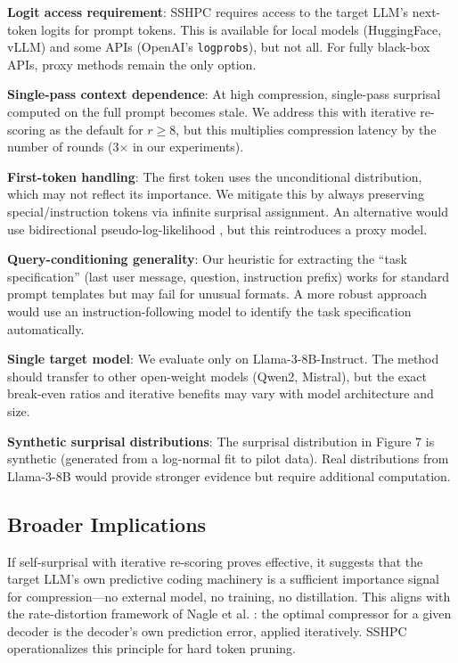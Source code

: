 \documentclass[11pt,letterpaper]{article}
\begin{document}
\textbf{Logit access requirement}: SSHPC requires access to the target LLM's next-token logits for prompt tokens. This is available for local models (HuggingFace, vLLM) and some APIs (OpenAI's \texttt{logprobs}), but not all. For fully black-box APIs, proxy methods remain the only option.

\textbf{Single-pass context dependence}: At high compression, single-pass surprisal computed on the full prompt becomes stale. We address this with iterative re-scoring as the default for $r \ge 8$, but this multiplies compression latency by the number of rounds (3$\times$ in our experiments).

\textbf{First-token handling}: The first token uses the unconditional distribution, which may not reflect its importance. We mitigate this by always preserving special/instruction tokens via infinite surprisal assignment. An alternative would use bidirectional pseudo-log-likelihood \citep{Salazar2020}, but this reintroduces a proxy model.

\textbf{Query-conditioning generality}: Our heuristic for extracting the ``task specification'' (last user message, question, instruction prefix) works for standard prompt templates but may fail for unusual formats. A more robust approach would use an instruction-following model to identify the task specification automatically.

\textbf{Single target model}: We evaluate only on Llama-3-8B-Instruct. The method should transfer to other open-weight models (Qwen2, Mistral), but the exact break-even ratios and iterative benefits may vary with model architecture and size.

\textbf{Synthetic surprisal distributions}: The surprisal distribution in Figure 7 is synthetic (generated from a log-normal fit to pilot data). Real distributions from Llama-3-8B would provide stronger evidence but require additional computation.

\subsection{Broader Implications}

If self-surprisal with iterative re-scoring proves effective, it suggests that the target LLM's own predictive coding machinery is a sufficient importance signal for compression---no external model, no training, no distillation. This aligns with the rate-distortion framework of Nagle et al. \citep{Nagle2024}: the optimal compressor for a given decoder is the decoder's own prediction error, applied iteratively. SSHPC operationalizes this principle for hard token pruning.
\end{document}
